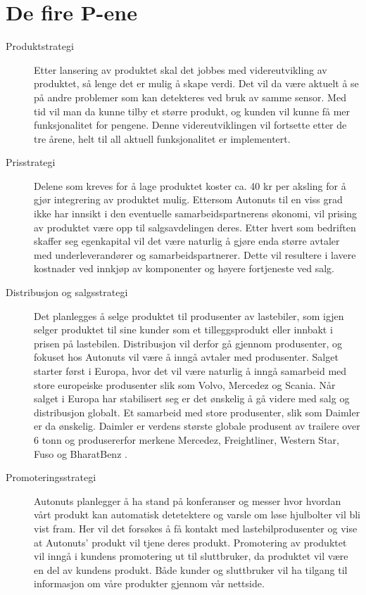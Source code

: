 \section{De fire P-ene}
\begin{description}
	\item[Produktstrategi] Etter lansering av produktet skal det jobbes med videreutvikling av produktet, så lenge det er mulig å skape verdi. Det vil da være aktuelt å se på andre problemer som kan detekteres ved bruk av 			samme sensor. Med tid vil man da kunne tilby et større produkt, og kunden vil kunne få mer 			funksjonalitet for pengene. Denne videreutviklingen vil fortsette etter de tre årene, helt til all aktuell 		funksjonalitet er implementert.
	\item[Prisstrategi] Delene som kreves for å lage produktet koster ca. 40 kr per aksling for å gjør integrering av produktet mulig. Ettersom Autonuts til en viss grad ikke har innsikt i den eventuelle samarbeidspartnerens økonomi, vil prising av produktet være opp til salgsavdelingen deres. Etter hvert som bedriften skaffer seg egenkapital vil det være naturlig å gjøre enda større avtaler med underleverandører og samarbeidspartnerer. Dette vil resultere i lavere kostnader ved innkjøp av komponenter og høyere fortjeneste ved salg.
	\item[Distribusjon og salgsstrategi] Det planlegges å selge produktet til produsenter av lastebiler, som igjen selger produktet til sine kunder som et tilleggsprodukt eller innbakt i prisen på lastebilen. 			Distribusjon vil derfor gå gjennom produsenter, og fokuset hos Autonuts vil være å inngå avtaler med 			produsenter. Salget starter først i Europa, hvor det vil være naturlig å inngå samarbeid med store europeiske produsenter slik som Volvo, Mercedez og Scania. Når salget i Europa har stabilisert seg er det ønskelig å gå videre med salg og distribusjon globalt. Et samarbeid med store produsenter, slik som Daimler \cite{daimler} er da ønskelig. Daimler er verdens største globale produsent av 				trailere over 6 tonn og produsererfor merkene Mercedez, Freightliner, Western Star, Fuso og 			BharatBenz \cite{daimler}.
	\item[Promoteringsstrategi] Autonuts planlegger å ha stand på konferanser og messer hvor hvordan vårt 	produkt kan automatisk detetektere og varsle om løse hjulbolter vil bli vist fram. Her vil det forsøkes å få kontakt med 			lastebilprodusenter og vise at Autonuts' produkt vil tjene deres produkt. Promotering av produktet vil 		inngå i kundens promotering ut til sluttbruker, da produktet vil være en del av kundens produkt. 		Både kunder og 	sluttbruker vil ha tilgang til informasjon om våre produkter gjennom vår nettside.
\end{description}
